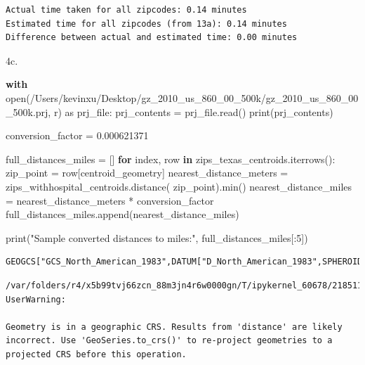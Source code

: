 \documentclass[
  letterpaper,
  DIV=11,
  numbers=noendperiod]{scrartcl}
\newenvironment{Shaded}{\begin{snugshade}}{\end{snugshade}}
\newcommand{\BuiltInTok}[1]{\textcolor[rgb]{0.00,0.23,0.31}{#1}}
\newcommand{\ControlFlowTok}[1]{\textcolor[rgb]{0.00,0.23,0.31}{\textbf{#1}}}
\newcommand{\DecValTok}[1]{\textcolor[rgb]{0.68,0.00,0.00}{#1}}
\newcommand{\FloatTok}[1]{\textcolor[rgb]{0.68,0.00,0.00}{#1}}
\newcommand{\ImportTok}[1]{\textcolor[rgb]{0.00,0.46,0.62}{#1}}
\newcommand{\KeywordTok}[1]{\textcolor[rgb]{0.00,0.23,0.31}{\textbf{#1}}}
\newcommand{\NormalTok}[1]{\textcolor[rgb]{0.00,0.23,0.31}{#1}}
\newcommand{\OperatorTok}[1]{\textcolor[rgb]{0.37,0.37,0.37}{#1}}
\newcommand{\StringTok}[1]{\textcolor[rgb]{0.13,0.47,0.30}{#1}}
\begin{document}
\begin{verbatim}
Actual time taken for all zipcodes: 0.14 minutes
Estimated time for all zipcodes (from 13a): 0.14 minutes
Difference between actual and estimated time: 0.00 minutes
\end{verbatim}

4c.

\begin{Shaded}
\begin{Highlighting}[]
\ControlFlowTok{with} \BuiltInTok{open}\NormalTok{(}\StringTok{\textquotesingle{}/Users/kevinxu/Desktop/gz\_2010\_us\_860\_00\_500k/gz\_2010\_us\_860\_00\_500k.prj\textquotesingle{}}\NormalTok{, }\StringTok{\textquotesingle{}r\textquotesingle{}}\NormalTok{) }\ImportTok{as}\NormalTok{ prj\_file:}
\NormalTok{    prj\_contents }\OperatorTok{=}\NormalTok{ prj\_file.read()}
    \BuiltInTok{print}\NormalTok{(prj\_contents)}

\NormalTok{conversion\_factor }\OperatorTok{=} \FloatTok{0.000621371}

\NormalTok{full\_distances\_miles }\OperatorTok{=}\NormalTok{ []}
\ControlFlowTok{for}\NormalTok{ index, row }\KeywordTok{in}\NormalTok{ zips\_texas\_centroids.iterrows():}
\NormalTok{    zip\_point }\OperatorTok{=}\NormalTok{ row[}\StringTok{\textquotesingle{}centroid\_geometry\textquotesingle{}}\NormalTok{]}
\NormalTok{    nearest\_distance\_meters }\OperatorTok{=}\NormalTok{ zips\_withhospital\_centroids.distance(}
\NormalTok{        zip\_point).}\BuiltInTok{min}\NormalTok{()}
\NormalTok{    nearest\_distance\_miles }\OperatorTok{=}\NormalTok{ nearest\_distance\_meters }\OperatorTok{*}\NormalTok{ conversion\_factor}
\NormalTok{    full\_distances\_miles.append(nearest\_distance\_miles)}

\BuiltInTok{print}\NormalTok{(}\StringTok{"Sample converted distances to miles:"}\NormalTok{, full\_distances\_miles[:}\DecValTok{5}\NormalTok{])}
\end{Highlighting}
\end{Shaded}

\begin{verbatim}
GEOGCS["GCS_North_American_1983",DATUM["D_North_American_1983",SPHEROID["GRS_1980",6378137,298.257222101]],PRIMEM["Greenwich",0],UNIT["Degree",0.017453292519943295]]
\end{verbatim}

\begin{verbatim}
/var/folders/r4/x5b99tvj66zcn_88m3jn4r6w0000gn/T/ipykernel_60678/2185113247.py:10: UserWarning:

Geometry is in a geographic CRS. Results from 'distance' are likely incorrect. Use 'GeoSeries.to_crs()' to re-project geometries to a projected CRS before this operation.

\end{verbatim}
\end{document}
